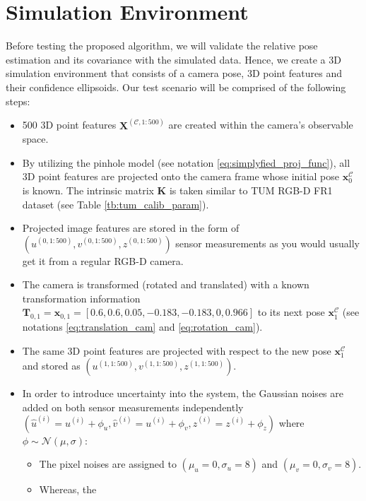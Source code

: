 \documentclass[a4paper]{report}
\numberwithin{figure}{section}
\begin{document}
\section{Simulation Environment}\label{sc_sim_env}

Before testing the proposed algorithm, we will validate the relative 
pose estimation and its covariance with the simulated data. Hence, 
we create a 3D simulation environment that consists of a camera pose, 
3D point features and their confidence ellipsoids. Our test scenario 
will be comprised of the following steps:

\begin{itemize}
  \item 500 3D point features $\mathbf{X}^{(\mathcal{C}, 1:500)}$ are created 
  within the camera's observable space.
  \item By utilizing the pinhole model (see notation 
  \eqref{eq:simplyfied_proj_func}), 
    all 3D point features are projected 
    onto the camera frame whose initial pose $\mathbf{x}_0^{\mathcal{C}}$ is known. 
    The intrinsic matrix $\mathbf{K}$ is taken similar to TUM RGB-D FR1  
    dataset (see Table \ref{tb:tum_calib_param}).
  \item Projected image features are stored in the form of 
    $(u^{(0, 1:500)}, v^{(0, 1:500)},z^{(0, 1:500)})$ sensor 
    measurements as you would usually get it from 
      a regular RGB-D camera. 
    \item The camera is transformed (rotated and translated) with a known transformation information 
      $\mathbf{T}_{0,1} = \mathbf{x}_{0,1} = [0.6, 0.6, 0.05, -0.183, -0.183, 0, 0.966]$ 
      to its next pose $\mathbf{x}_1^{\mathcal{C}}$ 
      (see notations \eqref{eq:translation_cam} and \eqref{eq:rotation_cam}).
    \item The same 3D point features are projected with respect to the new pose 
      $\mathbf{x}_1^{\mathcal{C}}$ 
      and stored as $(u^{(1, 1:500)}, v^{(1, 1:500)},z^{(1, 1:500)})$.
    \item In order to introduce uncertainty into the system, the Gaussian 
      noises are added on both sensor measurements independently
      $(\hat{u}^{(i)}=u^{(i)}+\phi_u, 
        \hat{v}^{(i)}=u^{(i)}+\phi_v,
      \hat{z}^{(i)}=z^{(i)}+\phi_z)$ where $\phi\sim\mathcal{N}(\mu,\sigma)$:
      \begin{itemize}
          \item The pixel noises are
            assigned to $(\mu_u=0,\sigma_u=8)$ and $(\mu_v=0,\sigma_v=8)$. 
          \item Whereas, the 

\end{itemize}
\end{itemize}
\end{document}
